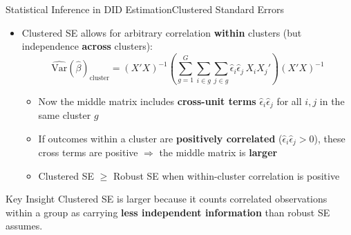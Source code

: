 \documentclass[dvipsnames,hyperref={pdfpagelabels=false}]{beamer}
\begin{document}
\begin{frame}{Statistical Inference in DID Estimation}{Clustered Standard Errors}
    \begin{itemize}
        \item Clustered SE allows for arbitrary correlation \textbf{within} clusters (but independence \textbf{across} clusters):
        \[
        \widehat{\text{Var}}(\hat{\beta})_{\text{cluster}}
        = \left(X'X\right)^{-1}
          \left(\sum_{g=1}^{G} \sum_{i \in g} \sum_{j \in g}
          \hat{\epsilon}_i \hat{\epsilon}_j\, X_i X_j'\right)
          \left(X'X\right)^{-1}
        \]
        \vspace{0.1cm}
        \begin{itemize}
            \item Now the middle matrix includes \textbf{cross-unit terms} $\hat{\epsilon}_i \hat{\epsilon}_j$ for all $i, j$ in the same cluster $g$
            \vspace{0.2cm}
            \item If outcomes within a cluster are \textbf{positively correlated} ($\hat{\epsilon}_i \hat{\epsilon}_j > 0$), these cross terms are positive $\Rightarrow$ the middle matrix is \textbf{larger}
            \vspace{0.2cm}
            \item[$\Rightarrow$] Clustered SE $\geq$ Robust SE when within-cluster correlation is positive
        \end{itemize}
    \end{itemize}

    \begin{alertblock}{Key Insight}
        Clustered SE is larger because it counts correlated observations within a group as carrying \textbf{less independent information} than robust SE assumes.
    \end{alertblock}
\end{frame}
\end{document}
